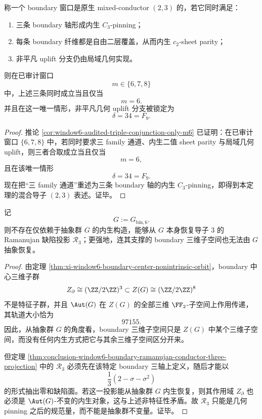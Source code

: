 \begin{theorem}\label{thm:conclusion-window6-mixed-conductor-two-three-rigidity}
称一个 boundary 窗口是原生 mixed-conductor \((2,3)\) 的，若它同时满足：
\begin{enumerate}
  \item 三条 boundary 轴形成内生 \(C_3\)-pinning；
  \item 每条 boundary 纤维都是自由二层覆盖，从而内生 \(c_2\)-sheet parity；
  \item 非平凡 uplift 分支仍由局域几何实现。
\end{enumerate}
则在已审计窗口
\[
m\in\{6,7,8\}
\]
中，上述三条同时成立当且仅当
\[
m=6.
\]
并且在这一唯一情形，非平凡几何 uplift 分支被锁定为
\[
\delta=34=F_9.
\]
\end{theorem}
\begin{proof}
推论 \ref{cor:window6-audited-triple-conjunction-only-m6} 已证明：在已审计窗口 \(\{6,7,8\}\) 中，若同时要求三 family 通道、内生二值 sheet parity 与局域几何 uplift，则三者合取成立当且仅当
\[
m=6,
\]
且在该唯一情形
\[
\delta=34=F_9.
\]
现在把“三 family 通道”重述为三条 boundary 轴的内生 \(C_3\)-pinning，即得到本定理的混合导子 \((2,3)\) 表述。证毕。
\end{proof}

\begin{proposition}\label{prop:conclusion-window6-ramanujan-defect-projection-geometric-not-abstract}
记
\[
G:=G_{\mathrm{bin},6}.
\]
则不存在仅依赖于抽象群 \(G\) 的内生构造，能够从 \(G\) 本身恢复导子 \(3\) 的 Ramanujan 缺陷投影 \(\mathcal R_3\)；更强地，连其支撑的 boundary 三维子空间也无法由 \(G\) 抽象恢复。
\end{proposition}
\begin{proof}
由定理 \ref{thm:xi-window6-boundary-center-nonintrinsic-orbit}，boundary 中心三维子群
\[
Z_{\partial}\cong (\ZZ/2\ZZ)^3
\subset
Z(G)\cong (\ZZ/2\ZZ)^8
\]
不是特征子群，并且 \(\Aut(G)\) 在 \(Z(G)\) 的全部三维 \(\FF_2\)-子空间上作用传递，其轨道大小恰为
\[
97155.
\]
因此，从抽象群 \(G\) 的角度看，boundary 三维子空间只是 \(Z(G)\) 中某个三维子空间，而没有任何内生方式把它与其余三维子空间区分开来。

但定理 \ref{thm:conclusion-window6-boundary-ramanujan-conductor-three-projection} 中的 \(\mathcal R_3\) 必须先在该特定 boundary 三轴上定义，随后才能以
\[
\frac13(2-\sigma-\sigma^2)
\]
的形式抽出零和缺陷面。若这一投影能从抽象群 \(G\) 内生恢复，则其作用域 \(Z_{\partial}\) 也必须是 \(\Aut(G)\)-不变的内生对象，这与上述非特征性矛盾。故 \(\mathcal R_3\) 只能是几何 pinning 之后的规范量，而不能是抽象群不变量。证毕。
\end{proof}

